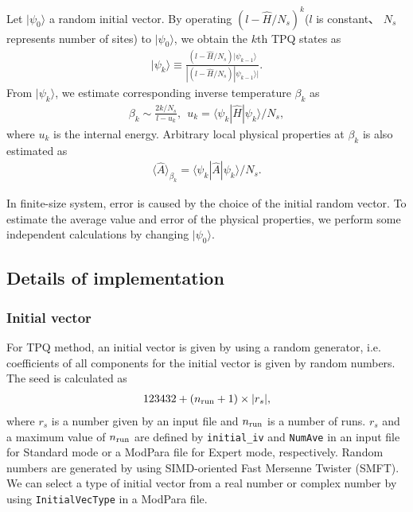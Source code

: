 Let $|\psi_{0}\rangle$ a random initial vector.
By operating $(l-\hat{H}/N_{s})^{k}$($l$ is constant、
$N_{s}$ represents number of sites) 
to $|\psi_{0}\rangle$,
we obtain the $k$th TPQ states as
\begin{align}
|\psi_{k}\rangle \equiv \frac{(l-\hat{H}/N_{s})|\psi_{k-1}\rangle}{|(l-\hat{H}/N_{s})|\psi_{k-1}\rangle|}.
\end{align}
From  $|\psi_{k}\rangle$, we estimate corresponding inverse temperature $\beta_{k}$ as
\begin{align}
\beta_{k}\sim \frac{2k/N_{s}}{l-u_{k}},~~
u_{k} = \langle \psi_{k}|\hat{H}|\psi_{k}\rangle/N_{s},
\end{align}
where $u_{k}$ is the internal energy.
Arbitrary local physical properties at $\beta_{k}$ is also estimated as
\begin{align}
\langle \hat{A}\rangle_{\beta_{k}} =  \langle \psi_{k}|\hat{A}|\psi_{k}\rangle/N_{s}.
\end{align}

In finite-size system,
error is caused by the choice of the initial random vector.
To estimate the average value and error of the physical properties,
we perform some independent calculations by changing $|\psi_{0}\rangle$.

\subsection{Details of implementation}
\subsubsection*{Initial vector}
For TPQ method, an initial vector is given by using a random generator, i.e. coefficients of all components for the initial vector is given by random numbers. The seed is calculated as 
\begin{align}
123432+(n_{\rm run}+1) \times |r_s|,
\end{align}
where $r_s$ is a number given by an input file and $n_{\rm run}$ is a number of runs. $r_s$ and a maximum value of $n_{\rm run}$ are defined by \verb|initial_iv| and \verb|NumAve| in an input file for Standard mode or a ModPara file for Expert mode, respectively. Random numbers are generated by 
using SIMD-oriented Fast Mersenne Twister (SMFT). We can select a type of initial vector from a real number or complex number by using \verb|InitialVecType| in a ModPara file.
